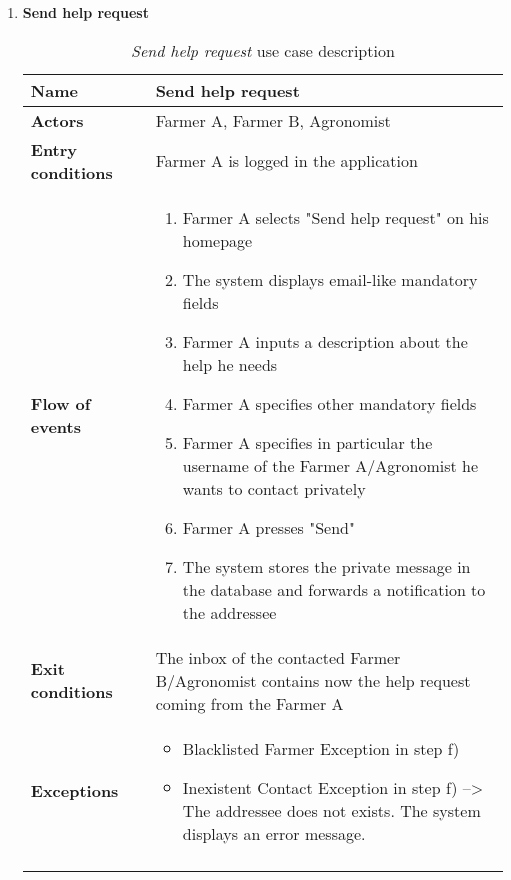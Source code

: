 \begin{enumerate}
				\FloatBarrier
				\newpage
			\item \textbf{Send help request}
				\begin{longtable}{p{0.26\linewidth}p{0.75\linewidth}}
					\toprule
					\textbf{Name} & \textbf{Send help request} \\
					\midrule
					\textbf{Actors} & Farmer A, Farmer B, Agronomist \\
					\midrule
					\textbf{Entry conditions} & Farmer A is logged in the application \\
					\midrule
					\textbf{Flow of events} & 
					\begin{enumerate}
						\item Farmer A selects "Send help request" on his homepage
						\item The system displays email-like mandatory fields
						\item Farmer A inputs a description about the help he needs
						\item Farmer A specifies other mandatory fields 
						\item Farmer A specifies in particular the username of the Farmer A/Agronomist he wants to contact privately
						\item Farmer A presses "Send"
						\item The system stores the private message in the database and forwards a notification to the addressee
					\end{enumerate} \\
					\midrule
					\textbf{Exit conditions} & The inbox of the contacted Farmer B/Agronomist contains now the help request coming from the Farmer A\\
					\midrule
					\textbf{Exceptions} & 
					\begin{itemize}
						\item Blacklisted Farmer Exception in step f)
						\item Inexistent Contact Exception in step f) --> The addressee does not exists. The system displays an error message.
					\end{itemize} \\
					\bottomrule
					\caption{\emph{Send help request} use case description}
				\end{longtable}
	

\end{enumerate}
